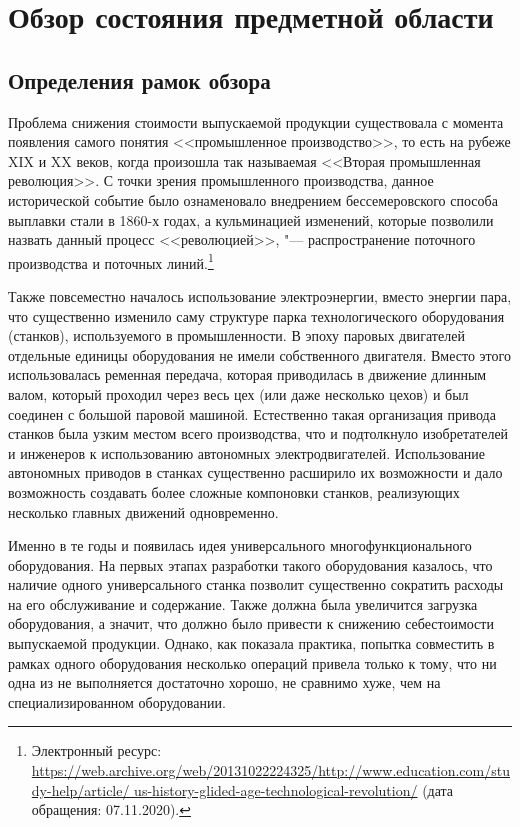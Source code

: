\chapter{Обзор состояния предметной области}\label{ch:ch1}

\section{Определения рамок обзора}\label{sec:ch1/sec1}

Проблема снижения стоимости выпускаемой продукции существовала с момента появления самого понятия <<промышленное производство>>, то есть на рубеже XIX и XX веков, когда произошла так называемая <<Вторая промышленная революция>>. С точки зрения промышленного производства, данное исторической событие было ознаменовало внедрением бессемеровского способа выплавки стали в 1860-х годах, а кульминацией изменений, которые позволили назвать данный процесс <<революцией>>, "--- распространение поточного производства и поточных линий.\footnote{Электронный ресурс: {\tiny\url{https://web.archive.org/web/20131022224325/http://www.education.com/study-help/article/ us-history-glided-age-technological-revolution/}} (дата обращения: 07.11.2020).}

Также повсеместно началось использование электроэнергии, вместо энергии пара, что существенно изменило саму структуре парка технологического оборудования (станков), используемого в промышленности. В эпоху паровых двигателей отдельные единицы оборудования не имели собственного двигателя. Вместо этого использовалась ременная передача, которая приводилась в движение длинным валом, который проходил через весь цех (или даже несколько цехов) и был соединен с большой паровой машиной. Естественно такая организация привода станков была узким местом всего производства, что и подтолкнуло изобретателей и инженеров к использованию автономных электродвигателей. Использование автономных приводов в станках существенно расширило их возможности и дало возможность создавать более сложные компоновки станков, реализующих несколько главных движений одновременно. 

Именно в те годы и появилась идея универсального многофункционального оборудования. На первых этапах разработки такого оборудования казалось, что наличие одного универсального станка позволит существенно сократить расходы на его обслуживание и содержание. Также должна была увеличится загрузка оборудования, а значит, что должно было привести к снижению себестоимости выпускаемой продукции. Однако, как показала практика, попытка совместить в рамках одного оборудования несколько операций привела только к тому, что ни одна из не выполняется достаточно хорошо, не сравнимо хуже, чем на специализированном оборудовании. 

